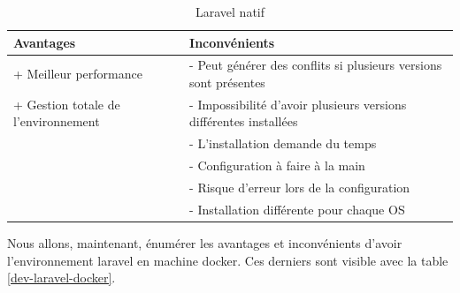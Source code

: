 \documentclass[
    iai, %
    il, %
]{heig-tb}
\begin{document}
\begin{table}[h]
    \begin{center}
        \caption{Laravel natif \label{dev-laravel-native}}
        \begin{tabularx}{1.0\textwidth} {X|X}
            Avantages                           & Inconvénients
            \\ \hline
            + Meilleur performance              & - Peut générer des conflits si plusieurs versions sont présentes \\
            + Gestion totale de l'environnement & - Impossibilité d'avoir plusieurs versions différentes
            installées                                                                                             \\
                                                & - L'installation demande du temps                                \\
                                                & - Configuration à faire à la main                                \\
                                                & - Risque d'erreur lors de la configuration                       \\
                                                & - Installation différente pour chaque OS                         \\
        \end{tabularx}
    \end{center}
\end{table}

Nous allons, maintenant, énumérer les avantages et inconvénients d'avoir l'environnement \Gls{laravel} en
machine \Gls{docker}. Ces derniers sont visible avec la table \ref{dev-laravel-docker}.
\end{document}

